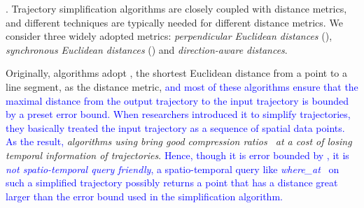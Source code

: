 . 
Trajectory simplification algorithms are closely coupled with distance metrics,
and different techniques are typically needed for different distance metrics. We consider three
widely adopted metrics: \emph{perpendicular Euclidean distances} (\ped), \emph{synchronous Euclidean distances} (\sed) and \emph{direction-aware distances}.








Originally, \lsa algorithms adopt \ped, {the shortest Euclidean distance from a point to a line segment, as the distance metric, \textcolor{blue}{and most of these algorithms ensure that the maximal distance from the output trajectory to the input trajectory is bounded by a preset \ped error bound. When researchers introduced it to simplify trajectories, they basically treated the input trajectory as a sequence of spatial data points. As the result,} \emph{\lsa algorithms using \ped bring good compression ratios~\cite{Douglas:Peucker, Hershberger:Speeding, Liu:BQS, Muckell:Compression, Chen:Trajectory, Cao:Spatio, Shi:Survey} at a cost of losing temporal information of trajectories}.} \textcolor{blue}{Hence, though it is error bounded by \ped, it is \emph{not spatio-temporal query friendly}, \ie a spatio-temporal query like \emph{where\_at}~\cite{Cao:Spatio} on such a simplified trajectory possibly returns a point that has a distance great larger than the \ped error bound used in the simplification algorithm.}

